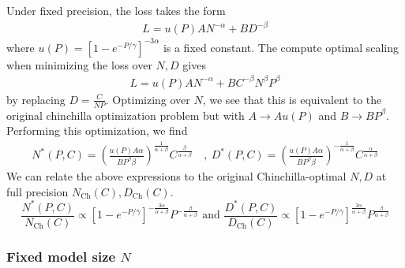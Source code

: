 \documentclass[11pt]{article}
\begin{document}
Under fixed precision, the loss takes the form
\begin{align}
    L = u(P) A  N^{- \alpha} + B D^{-\beta} 
\end{align}
where $u(P) = [1-e^{-P/\gamma}]^{-3\alpha}$ is a fixed constant. The compute optimal scaling when minimizing the loss over $N,D$ gives
\begin{align}
    L = u(P) A N^{- \alpha} + B C^{-\beta} N^\beta P^\beta
\end{align}
by replacing $D = \frac{C}{NP}$. Optimizing over $N$, we see that this is equivalent to the original chinchilla optimization problem but with $A \to A u(P)$ and $B \to B P^\beta$. Performing this optimization, we find
\begin{align}
    N^*(P,C) = \left( \frac{u(P) A \alpha}{B P^\beta \beta}  \right)^{\frac{1}{\alpha+\beta}} C^{\frac{\beta}{\alpha + \beta}} \quad ,  \ D^*(P,C) = \left( \frac{u(P) A \alpha}{B P^\beta \beta}  \right)^{- \frac{1}{\alpha+\beta}} C^{\frac{\alpha}{\alpha + \beta}}
\end{align}
We can relate the above expressions to the original Chinchilla-optimal $N, D$ at full precision $N_{\text{Ch}}(C), D_{\text{Ch}}(C)$. 
   \begin{equation}
    \label{eqn: N(P)}
        \frac{N^*(P, C)}{N_{\text{Ch}}(C)} \propto \left[1-e^{-P/\bar{\gamma}}\right]^{-\frac{3\alpha}{\alpha + \beta}} P^{-\frac{\beta}{\alpha + \beta}} \text{  and  } \frac{D^*(P, C)}{D_{\text{Ch}}(C)} \propto \left[1-e^{-P/\bar{\gamma}}\right]^{\frac{3\alpha}{\alpha + \beta}} P^{ \frac{\beta}{\alpha + \beta}}
    \end{equation}



\subsubsection{Fixed model size \texorpdfstring{$N$}{N}}
\end{document}
